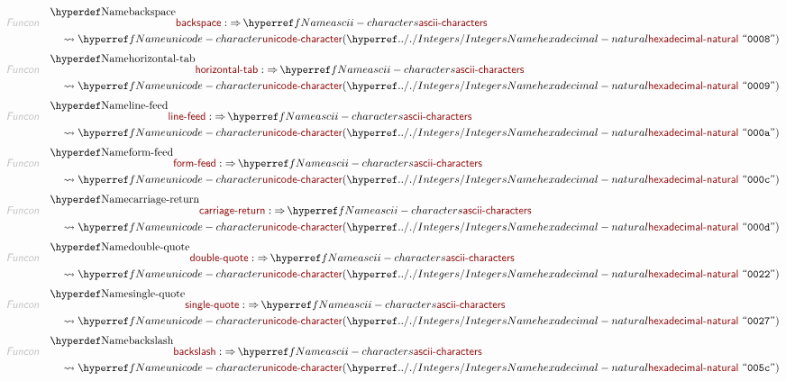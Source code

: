 \begin{align*}
  \KEY{Funcon} \quad
  & \NAMEDECL{backspace} 
    :  \TO \NAMEREF{ascii-characters} \\&\quad
    \leadsto \NAMEREF{unicode-character}
               (  \NAMEHYPER{../.}{Integers}{hexadecimal-natural} \ 
                       \STRING{0008} )
\end{align*}
\begin{align*}
  \KEY{Funcon} \quad
  & \NAMEDECL{horizontal-tab} 
    :  \TO \NAMEREF{ascii-characters} \\&\quad
    \leadsto \NAMEREF{unicode-character}
               (  \NAMEHYPER{../.}{Integers}{hexadecimal-natural} \ 
                       \STRING{0009} )
\end{align*}
\begin{align*}
  \KEY{Funcon} \quad
  & \NAMEDECL{line-feed} 
    :  \TO \NAMEREF{ascii-characters} \\&\quad
    \leadsto \NAMEREF{unicode-character}
               (  \NAMEHYPER{../.}{Integers}{hexadecimal-natural} \ 
                       \STRING{000a} )
\end{align*}
\begin{align*}
  \KEY{Funcon} \quad
  & \NAMEDECL{form-feed} 
    :  \TO \NAMEREF{ascii-characters} \\&\quad
    \leadsto \NAMEREF{unicode-character}
               (  \NAMEHYPER{../.}{Integers}{hexadecimal-natural} \ 
                       \STRING{000c} )
\end{align*}
\begin{align*}
  \KEY{Funcon} \quad
  & \NAMEDECL{carriage-return} 
    :  \TO \NAMEREF{ascii-characters} \\&\quad
    \leadsto \NAMEREF{unicode-character}
               (  \NAMEHYPER{../.}{Integers}{hexadecimal-natural} \ 
                       \STRING{000d} )
\end{align*}
\begin{align*}
  \KEY{Funcon} \quad
  & \NAMEDECL{double-quote} 
    :  \TO \NAMEREF{ascii-characters} \\&\quad
    \leadsto \NAMEREF{unicode-character}
               (  \NAMEHYPER{../.}{Integers}{hexadecimal-natural} \ 
                       \STRING{0022} )
\end{align*}
\begin{align*}
  \KEY{Funcon} \quad
  & \NAMEDECL{single-quote} 
    :  \TO \NAMEREF{ascii-characters} \\&\quad
    \leadsto \NAMEREF{unicode-character}
               (  \NAMEHYPER{../.}{Integers}{hexadecimal-natural} \ 
                       \STRING{0027} )
\end{align*}
\begin{align*}
  \KEY{Funcon} \quad
  & \NAMEDECL{backslash} 
    :  \TO \NAMEREF{ascii-characters} \\&\quad
    \leadsto \NAMEREF{unicode-character}
               (  \NAMEHYPER{../.}{Integers}{hexadecimal-natural} \ 
                       \STRING{005c} )
\end{align*}


